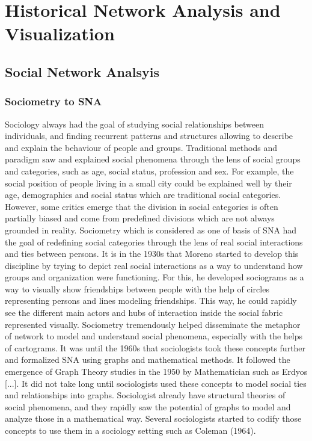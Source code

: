 
\chapter{Historical Network Analysis and Visualization}



\section{Social Network Analsyis}


\subsection{Sociometry to SNA}

Sociology always had the goal of studying social relationships between individuals, and finding recurrent patterns and structures allowing to describe and explain the behaviour of people and groups. Traditional methods and paradigm saw and explained social phenomena through the lens of social groups and categories, such as age, social status, profession and sex. For example, the social position of people living in a small city could be explained well by their age, demographics and social status which are traditional social categories.
However, some critics emerge that the division in social categories is often partially biased and come from predefined divisions which are not always grounded in reality.
Sociometry which is considered as one of basis of SNA had the goal of redefining social categories through the lens of real social interactions and ties between persons.
It is in the 1930s that Moreno started to develop this discipline by trying to depict real social interactions as a way to understand how groups and organization were functioning. For this, he developed sociograms as a way to visually show friendships between people with the help of circles representing persons and lines modeling friendships. This way, he could rapidly see the different main actors and hubs of interaction inside the social fabric represented visually. Sociometry tremendously helped disseminate the metaphor of network to model and understand social phenomena, especially with the helps of cartograms.
It was until the 1960s that sociologists took these concepts further and formalized SNA using graphs and mathematical methods. It followed the emergence of Graph Theory studies in the 1950 by Mathematician such as Erdyos [...].
It did not take long until sociologists used these concepts to model social ties and relationships into graphs. Sociologist already have structural theories of social phenomena, and they rapidly saw the potential of graphs to model and analyze those in a mathematical way. Several sociologists started to codify those concepts to use them in a sociology setting such as Coleman (1964).

